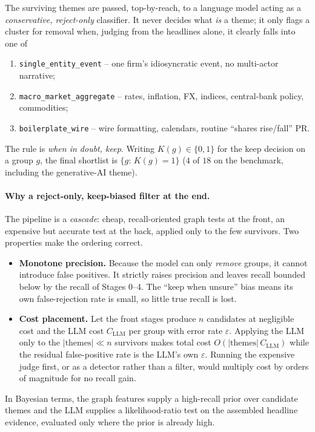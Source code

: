 \documentclass[11pt]{article}
\theoremstyle{definition}
\theoremstyle{remark}
\begin{document}
The surviving themes are passed, top-by-reach, to a language model acting as a
\emph{conservative, reject-only} classifier. It never decides what \emph{is} a theme; it only
flags a cluster for removal when, judging from the headlines alone, it clearly falls into one of
\begin{enumerate}[leftmargin=1.6em,nosep]
  \item \texttt{single\_entity\_event} -- one firm's idiosyncratic event, no multi-actor narrative;
  \item \texttt{macro\_market\_aggregate} -- rates, inflation, FX, indices, central-bank policy, commodities;
  \item \texttt{boilerplate\_wire} -- wire formatting, calendars, routine ``shares rise/fall'' PR.
\end{enumerate}
The rule is \emph{when in doubt, keep}. Writing $K(g)\in\{0,1\}$ for the keep decision on a
group $g$, the final shortlist is $\{g:\,K(g)=1\}$ ($4$ of $18$ on the benchmark, including the
generative-AI theme).

\paragraph{Why a reject-only, keep-biased filter at the end.}
The pipeline is a \emph{cascade}: cheap, recall-oriented graph tests at the front, an expensive
but accurate test at the back, applied only to the few survivors. Two properties make the
ordering correct.
\begin{itemize}[leftmargin=1.6em]
  \item \textbf{Monotone precision.} Because the model can only \emph{remove} groups, it cannot
        introduce false positives. It strictly raises precision and leaves recall bounded below
        by the recall of Stages 0--4. The ``keep when unsure'' bias means its own false-rejection
        rate is small, so little true recall is lost.
  \item \textbf{Cost placement.} Let the front stages produce $n$ candidates at negligible cost
        and the LLM cost $C_{\text{LLM}}$ per group with error rate $\varepsilon$. Applying the
        LLM only to the $|{\text{themes}}|\ll n$ survivors makes total cost
        $O(|{\text{themes}}|\,C_{\text{LLM}})$ while the residual false-positive rate is the LLM's
        own $\varepsilon$. Running the expensive judge first, or as a detector rather than a
        filter, would multiply cost by orders of magnitude for no recall gain.
\end{itemize}
In Bayesian terms, the graph features supply a high-recall prior over candidate themes and the
LLM supplies a likelihood-ratio test on the assembled headline evidence, evaluated only where the
prior is already high.
\end{document}
